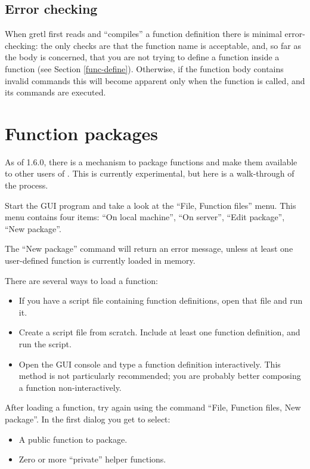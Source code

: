 \subsection{Error checking}

When gretl first reads and ``compiles'' a function definition there is
minimal error-checking: the only checks are that the function name is
acceptable, and, so far as the body is concerned, that you are not
trying to define a function inside a function (see Section
\ref{func-define}). Otherwise, if the function body contains invalid
commands this will become apparent only when the function is called,
and its commands are executed.

\section{Function packages}
\label{func-packages}

As of  1.6.0, there is a mechanism to package functions and
make them available to other users of .  This is currently
experimental, but here is a walk-through of the process.

Start the GUI program and take a look at the ``File, Function files'' menu.
This menu contains four items: ``On local machine'', ``On server'', ``Edit
package'', ``New package''.

The ``New package'' command will return an error message, unless at least one
user-defined function is currently loaded in memory.

There are several ways to load a function:

\begin{itemize}
\item If you have a script file containing function definitions, open
  that file and run it.
\item Create a script file from scratch.  Include at least one
  function definition, and run the script.
\item Open the GUI console and type a function definition
  interactively.  This method is not particularly recommended; you are
  probably better composing a function non-interactively.
\end{itemize}

After loading a function, try again using the command ``File, Function
files, New package''. In the first dialog you get to select:

\begin{itemize}
\item A public function to package.
\item Zero or more ``private'' helper functions.
\end{itemize}

